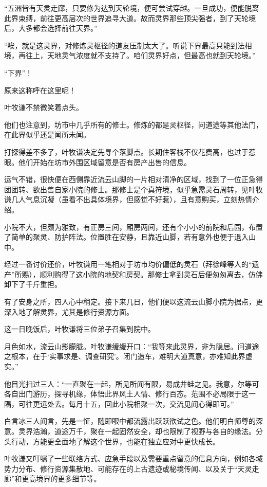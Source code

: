 “五洲皆有天灵走廊，只要修为达到天轮境，便可尝试穿越。一旦成功，便能脱离此界束缚，前往更高层次的世界追寻大道。故而灵界那些顶尖强者，到了天轮境后，大多都会选择前往天界。”

“唉，就是这灵界，对修炼灵枢径的道友压制太大了。听说下界最高只能到法相境，再往上，天地灵气浓度就不支持了。咱们灵界好点，但最高也就到天轮境。”

“下界”！

原来这称呼在这里呢！

叶牧谦不禁微笑着点头。

他们也注意到，坊市中几乎所有的修士。修炼的都是灵枢径，问道途等其他法门，在此界似乎还是闻所未闻。

\vspace{2em}

打探得差不多了，叶牧谦决定先寻个落脚点。长期住客栈不仅花费高，也过于惹眼。他们开始在坊市外围区域留意是否有房产出售的信息。

运气不错，很快便在西侧靠近流云山脚的一片相对清净的区域，找到了一位正急得团团转、欲出售自家小院的修士。那修士是个真符境，似乎急需灵石周转，见叶牧谦几人气息沉凝（虽看不出具体境界，但感觉不好惹），且有意购买，立刻热情介绍。

小院不大，但颇为雅致，有正房三间，厢房两间，还有个小小的前院和后园，布置了简单的聚灵、防护阵法。位置胜在安静，且靠近山脚，若有意外也便于退入山中。

经过一番讨价还价，叶牧谦用一笔相对于坊市均价偏低的灵石（拜徐峰等人的“遗产”所赐），顺利购得了这小院的地契和房契。那修士拿到灵石后便匆匆离去，仿佛卸下了千斤重担。

有了安身之所，四人心中稍定。接下来几日，他们便以这流云山脚小院为据点，更深入地了解灵界，尤其是修行资源方面。

这一日晚饭后，叶牧谦将三位弟子召集到院中。

月色如水，流云山影朦胧。叶牧谦缓缓开口：“我等来此灵界，非为隐居。问道途之根本，在于‘实事求是、调查研究’。闭门造车，难明大道真意，亦难知此界虚实。”

他目光扫过三人：“一直聚在一起，所见所闻有限，易成井蛙之见。我意，尔等可各自出门游历，探寻机缘，体悟此界风土人情、修行百态。范围不必局限于这一隅，可往更远处去。每月十五，回此小院相聚一次，交流见闻心得即可。”

白言冰三人闻言，先是一怔，随即眼中都流露出跃跃欲试之色。他们明白师尊的深意。灵界浩瀚，道途万千，聚在一起固然安全，却也限制了视野与各自的缘法。分头行动，方能更全面地了解这个世界，也能在独立应对中更快成长。

叶牧谦又叮嘱了一些联络方式、应急手段以及需要重点留意的信息方向，例如各域势力分布、修行资源集散地、可能存在的上古遗迹或秘境传闻、以及关于“天灵走廊”和更高境界的更多细节等。

